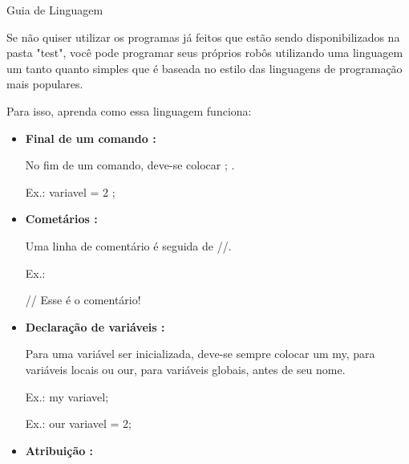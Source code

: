 \documentclass[a4paper]{article}
\begin{document}
{{{{{{{{\textcolor{NavyBlue}{\LARGE Guia de Linguagem}

    \bigskip
    \bigskip
    
    Se não quiser utilizar os programas já feitos
    que estão sendo disponibilizados na pasta "test",
    você pode programar seus próprios robôs utilizando
    uma linguagem um tanto quanto simples que é baseada
    no estilo das linguagens de programação mais 
    populares. 
    
    Para isso, aprenda como essa linguagem funciona:
    
    \begin{itemize}
        
        \item \textbf{Final de um comando :}
        
            No fim de um comando, deve-se colocar 
            \textcolor{NavyBlue}{;}
            .
        
            \textcolor{NavyBlue}{Ex.:} variavel = 2
            \textcolor{NavyBlue}{;}
        
        \bigskip
        
        \item \textbf{Cometários :}
            
            Uma linha de comentário é seguida de 
            \textcolor{NavyBlue}{//}.
            
            \textcolor{NavyBlue}{Ex.:}
            
            // Esse é o comentário!
       
       \bigskip
       
        \item \textbf{Declaração de variáveis :}
        
            Para uma variável ser inicializada, deve-se
            sempre colocar um 
            \textcolor{NavyBlue}{my},
            para variáveis locais ou 
            \textcolor{NavyBlue}{our},
            para variáveis globais,
            antes de seu nome.
            
            \textcolor{NavyBlue}{Ex.:}
            \textcolor{NavyBlue}{my} 
            variavel;
        
            \textcolor{NavyBlue}{Ex.:} 
            \textcolor{NavyBlue}{our} variavel = 2;  
        
        \bigskip
        
        \item \textbf{Atribuição :}
        

\end{itemize}}}}}}}}}
\end{document}
